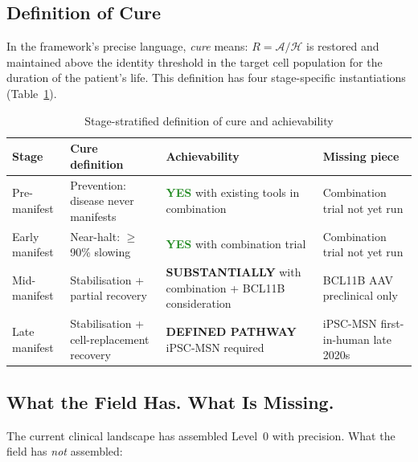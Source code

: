 \documentclass[12pt,a4paper]{article}
\newcommand{\Rratio}{R}
\newcommand{\IA}{\mathcal{A}}
\newcommand{\Hub}{\mathcal{H}}
\begin{document}
\subsection{Definition of Cure}

In the framework's precise language, \emph{cure} means:
$\Rratio = \IA/\Hub$ is restored and maintained above the
identity threshold in the target cell population for the
duration of the patient's life.
This definition has four stage-specific instantiations
(Table~\ref{tab:cure}).

\begin{table}[ht!]
\centering
\caption{Stage-stratified definition of cure and achievability}
\label{tab:cure}
\begin{tabular}{p{2.0cm}p{3.2cm}p{3.4cm}p{3.0cm}}
\toprule
\textbf{Stage} &
\textbf{Cure definition} &
\textbf{Achievability} &
\textbf{Missing piece} \\
\midrule
Pre-manifest &
Prevention: disease never manifests &
\textcolor{forestgreen}{\textbf{YES}} with existing tools
in combination &
Combination trial not yet run \\[4pt]
Early manifest &
Near-halt: $\geq$90\% slowing &
\textcolor{forestgreen}{\textbf{YES}} with combination
trial &
Combination trial not yet run \\[4pt]
Mid-manifest &
Stabilisation + partial recovery &
\textcolor{amber}{\textbf{SUBSTANTIALLY}}
with combination + BCL11B consideration &
BCL11B AAV preclinical only \\[4pt]
Late manifest &
Stabilisation + cell-replacement recovery &
\textcolor{amber}{\textbf{DEFINED PATHWAY}}
iPSC-MSN required &
iPSC-MSN first-in-human late 2020s \\
\bottomrule
\end{tabular}
\end{table}

\subsection{What the Field Has. What Is Missing.}

The current clinical landscape has assembled Level~0 with
precision. What the field has \emph{not} assembled:
\end{document}
